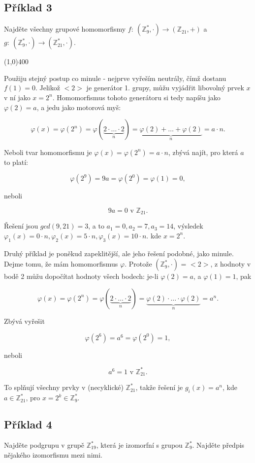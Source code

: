 \documentclass{article}
\begin{document}
\subsection{Příklad 3}
Najděte všechny grupové homomorfismy $f: \: (\mathbb{Z}_{9}^*,\cdot) \rightarrow (\mathbb{Z}_{21},+)$ a $g: \: (\mathbb{Z}_{9}^*,\cdot) \rightarrow (\mathbb{Z}_{21}^*,\cdot)$.

\line(1,0){400}

Použiju stejný postup co minule - nejprve vyřeším neutrály, čímž dostanu $f(1) = 0$. Jelikož ${<}2{>}$ je generátor 1. grupy, můžu vyjádřit libovolný prvek $x$ v ní jako $x=2^n$. Homomorfismus tohoto generátoru si tedy napíšu jako $\varphi(2) = a$, a jedu jako motorová myš:

\[ \varphi(x) = \varphi(2^n) = \varphi(\underbrace{2\cdot\ldots\cdot2}_{n}) = \underbrace{\varphi(2) + \ldots + \varphi(2)}_{n} =
 a\cdot n. \]

Neboli tvar homomorfismu je $\varphi(x) = \varphi(2^n) = a\cdot n$, zbývá najít, pro která $a$ to platí:

\[ \varphi(2^9) = 9a = \varphi(2^0) = \varphi(1) = 0, \]

neboli

\[ 9a = 0 \mbox{ v } \mathbb{Z}_{21}. \]

Řešení jsou $gcd(9,21) = 3$, a to  $a_1 = 0, a_2 = 7, a_3 = 14$, výsledek $\varphi_1(x) = 0\cdot n, \varphi_2(x) = 5 \cdot n, \varphi_3(x) = 10\cdot n$. kde $x = 2^n$.

Druhý příklad je poněkud zapeklitější, ale jeho řešení podobné, jako minule. Dejme tomu, že mám homomorfismus $\varphi$. Protože $(\mathbb{Z}_{9}^*,\cdot)$ = $<2>$, z hodnoty v bodě 2 můžu dopočítat hodnoty všech bodech: je-li $\varphi(2) = a$, a $\varphi(1) = 1$, pak

\[ \varphi(x) = \varphi(2^n) = \varphi(\underbrace{2\cdot\ldots\cdot2}_{n}) = \underbrace{\varphi(2)\cdot \ldots \cdot \varphi(2)}_{n} = a^n. \]

Zbývá vyřešit

\[ \varphi(2^6) = a^6 = \varphi(2^0) = 1, \]

neboli 

\[ a^6 = 1 \mbox{ v } \mathbb{Z}_{21}^*. \]

To splňují všechny prvky v (necyklické) $\mathbb{Z}_{21}^*$, takže řešení je $g_i(x) = a^n$, kde $a \in \mathbb{Z}_{21}^*$, pro $x = 2^k \in \mathbb{Z}_{9}^*$.

\subsection{Příklad 4}
Najděte podgrupu v grupě $\mathbb{Z}_{19}^*$, která je izomorfní s grupou $\mathbb{Z}_{9}^*$. Najděte předpis nějakého izomorfismu mezi nimi.
\end{document}
